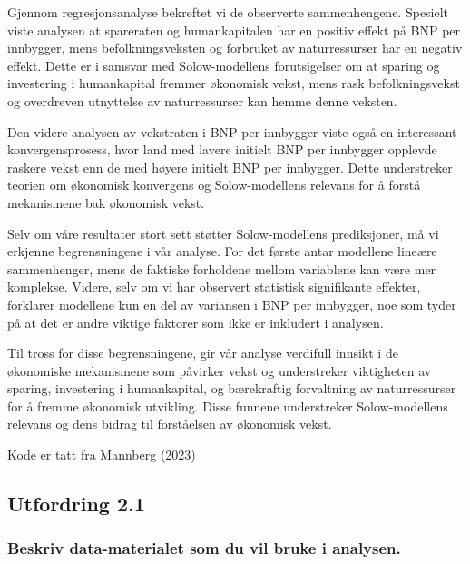 \documentclass[
  12pt,
  a4paper,
  DIV=11,
  numbers=noendperiod]{scrartcl}
\renewcommand*\contentsname{Table of contents}
\newcommand\contentsname{Table of contents}
\begin{document}
Gjennom regresjonsanalyse bekreftet vi de observerte sammenhengene. Spesielt viste analysen at spareraten og humankapitalen har en positiv effekt på BNP per innbygger, mens befolkningsveksten og forbruket av naturressurser har en negativ effekt. Dette er i samsvar med Solow-modellens forutsigelser om at sparing og investering i humankapital fremmer økonomisk vekst, mens rask befolkningsvekst og overdreven utnyttelse av naturressurser kan hemme denne veksten.

Den videre analysen av vekstraten i BNP per innbygger viste også en interessant konvergensprosess, hvor land med lavere initielt BNP per innbygger opplevde raskere vekst enn de med høyere initielt BNP per innbygger. Dette understreker teorien om økonomisk konvergens og Solow-modellens relevans for å forstå mekanismene bak økonomisk vekst.

Selv om våre resultater stort sett støtter Solow-modellens prediksjoner, må vi erkjenne begrensningene i vår analyse. For det første antar modellene lineære sammenhenger, mens de faktiske forholdene mellom variablene kan være mer komplekse. Videre, selv om vi har observert statistisk signifikante effekter, forklarer modellene kun en del av variansen i BNP per innbygger, noe som tyder på at det er andre viktige faktorer som ikke er inkludert i analysen.

Til tross for disse begrensningene, gir vår analyse verdifull innsikt i de økonomiske mekanismene som påvirker vekst og understreker viktigheten av sparing, investering i humankapital, og bærekraftig forvaltning av naturressurser for å fremme økonomisk utvikling. Disse funnene understreker Solow-modellens relevans og dens bidrag til forståelsen av økonomisk vekst.

\newpage
\hypersetup{linkcolor=black}
\renewcommand{\contentsname}{Innholdsfortegnelse}
\renewcommand*{\figureautorefname}{Figur}
\renewcommand*{\tableautorefname}{Tabell}
\tableofcontents
\newpage
\listoffigures
\listoftables
\hypersetup{linkcolor=blue}
\newpage

Kode er tatt fra Mannberg (2023)

\subsection{Utfordring 2.1}\label{utfordring-2.1}

\subsubsection{Beskriv data-materialet som du vil bruke i
analysen.}\label{beskriv-data-materialet-som-du-vil-bruke-i-analysen.}
\end{document}
